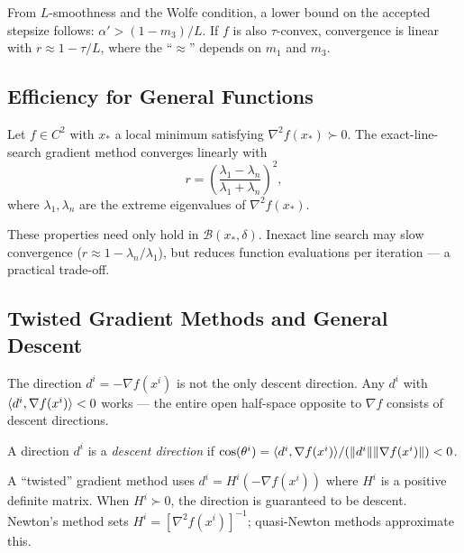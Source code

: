 From $L$-smoothness and the Wolfe condition, a lower bound on the accepted stepsize follows: $\alpha' > (1 - m_3)/L$.
If $f$ is also $\tau$-convex, convergence is linear with $r \approx 1 - \tau/L$, where the ``$\approx$'' depends on $m_1$ and $m_3$.


\subsection{Efficiency for General Functions}\label{ssec:efficiency-general}

\begin{thm}\label{thm:grad-general}
	Let $f \in C^2$ with $x_*$ a local minimum satisfying $\nabla^2 f(x_*) \succ 0$.
	The exact-line-search gradient method converges linearly with
	\begin{equation}\label{eq:local-convergence-rate}
		r = \left(\frac{\lambda_1 - \lambda_n}{\lambda_1 + \lambda_n}\right)^{\!2},
	\end{equation}
	where $\lambda_1, \lambda_n$ are the extreme eigenvalues of $\nabla^2 f(x_*)$.
\end{thm}

These properties need only hold in $\mathcal{B}(x_*, \delta)$.
Inexact line search may slow convergence ($r \approx 1 - \lambda_n/\lambda_1$), but reduces function evaluations per iteration --- a practical trade-off.


\subsection{Twisted Gradient Methods and General Descent}\label{ssec:twisted-descent}

The direction $d^i = -\nabla f(x^i)$ is not the only descent direction.
Any $d^i$ with $\langle d^i, \nabla f(x^i)\rangle < 0$ works --- the entire open half-space opposite to $\nabla f$ consists of descent directions.

\begin{defn}\label{def:descent-dir}
	A direction $d^i$ is a \textit{descent direction} if $\cos(\theta^i) = \langle d^i, \nabla f(x^i)\rangle / (\lVert d^i\rVert \lVert\nabla f(x^i)\rVert) < 0$.
\end{defn}

A ``twisted'' gradient method uses $d^i = H^i(-\nabla f(x^i))$ where $H^i$ is a positive definite matrix.
When $H^i \succ 0$, the direction is guaranteed to be descent.
Newton's method sets $H^i = [\nabla^2 f(x^i)]^{-1}$; quasi-Newton methods approximate this.

